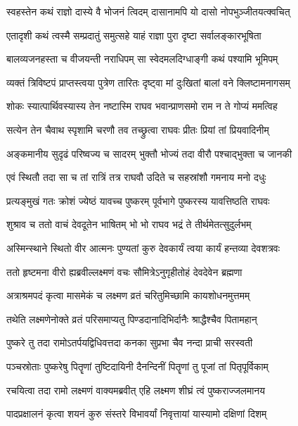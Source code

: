 \twolineshloka
{स्वहस्तेन कथं राज्ञो दास्ये वै भोजनं त्विदम्}
{दासानामपि यो दासो नोपभुञ्जीतयत्क्वचित्} %

\twolineshloka
{एतादृशी कथं त्वस्मै सम्प्रदातुं समुत्सहे}
{याहं राज्ञा पुरा दृष्टा सर्वालङ्कारभूषिता} %

\twolineshloka
{बालव्यजनहस्ता च वीजयन्ती नराधिपम्}
{सा स्वेदमलदिग्धाङ्गी कथं पश्यामि भूमिपम्} %

\twolineshloka
{व्यक्तं त्रिविष्टपं प्राप्तस्त्वया पुत्रेण तारितः}
{दृष्ट्वा मां दुःखितां बालां वने क्लिष्टामनागसम्} %

\twolineshloka
{शोकः स्यात्पार्थिवस्यास्य तेन नष्टास्मि राघव}
{भवान्प्राणसमो राम न ते गोप्यं ममत्विह} %

\twolineshloka
{सत्येन तेन चैवाथ स्पृशामि चरणौ तव}
{तच्छ्रुत्वा राघवः प्रीतः प्रियां तां प्रियवादिनीम्} %

\twolineshloka
{अङ्कमानीय सुदृढं परिष्वज्य च सादरम्}
{भुक्तौ भोज्यं तदा वीरौ पश्चाद्भुक्ता च जानकी} %

\twolineshloka
{एवं स्थितौ तदा सा च तां रात्रिं तत्र राघवौ}
{उदिते च सहस्रांशौ गमनाय मनो दधुः} %

\twolineshloka
{प्रत्यङ्मुखं गतः क्रोशं ज्येष्ठं यावच्च पुष्करम्}
{पूर्वभागे पुष्करस्य यावत्तिष्ठति राघवः} %

\twolineshloka
{शुश्राव च ततो वाचं देवदूतेन भाषितम्}
{भो भो राघव भद्रं ते तीर्थमेतत्सुदुर्लभम्} %

\twolineshloka
{अस्मिन्स्थाने स्थितो वीर आत्मनः पुण्यतां कुरु}
{देवकार्यं त्वया कार्यं हन्तव्या देवशत्रवः} %

\twolineshloka
{ततो हृष्टमना वीरो ह्यब्रवील्लक्ष्मणं वचः}
{सौमित्रेऽनुगृहीतोहं देवदेवेन ब्रह्मणा} %

\twolineshloka
{अत्राश्रमपदं कृत्वा मासमेकं च लक्ष्मण}
{व्रतं चरितुमिच्छामि कायशोधनमुत्तमम्} %

\twolineshloka
{तथेति लक्ष्मणेनोक्ते व्रतं परिसमाप्यतु}
{पिण्डदानादिभिर्दानैः श्राद्धैश्चैव पितामहान्} %

\twolineshloka
{पुष्करे तु तदा रामोऽतर्पयद्विधिवत्तदा}
{कनका सुप्रभा चैव नन्दा प्राची सरस्वती} %

\twolineshloka
{पञ्चस्रोताः पुष्करेषु पितॄणां तुष्टिदायिनी}
{दैनन्दिनीं पितॄणां तु पूजां तां पितृपूर्विकाम्} %

\twolineshloka
{रचयित्वा तदा रामो लक्ष्मणं वाक्यमब्रवीत्}
{एहि लक्ष्मण शीघ्रं त्वं पुष्कराज्जलमानय} %

\twolineshloka
{पादप्रक्षालनं कृत्वा शयनं कुरु संस्तरे}
{विभावर्यां निवृत्तायां यास्यामो दक्षिणां दिशम्} %

